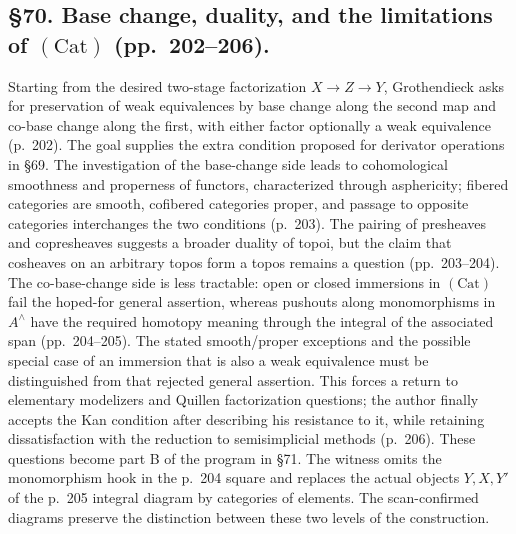 \documentclass[10pt,oneside]{book}
\begin{document}
\subsection*{\S70. Base change, duality, and the limitations of $(\mathrm{Cat})$ (pp.\ 202--206).}
Starting from the desired two-stage factorization $X\to Z\to Y$, Grothendieck asks for preservation of weak equivalences by base change along the second map and co-base change along the first, with either factor optionally a weak equivalence (p.\ 202). The goal supplies the extra condition proposed for derivator operations in \S69. The investigation of the base-change side leads to cohomological smoothness and properness of functors, characterized through asphericity; fibered categories are smooth, cofibered categories proper, and passage to opposite categories interchanges the two conditions (p.\ 203). The pairing of presheaves and copresheaves suggests a broader duality of topoi, but the claim that cosheaves on an arbitrary topos form a topos remains a question (pp.\ 203--204). The co-base-change side is less tractable: open or closed immersions in $(\mathrm{Cat})$ fail the hoped-for general assertion, whereas pushouts along monomorphisms in $A^{\wedge}$ have the required homotopy meaning through the integral of the associated span (pp.\ 204--205). The stated smooth/proper exceptions and the possible special case of an immersion that is also a weak equivalence must be distinguished from that rejected general assertion. This forces a return to elementary modelizers and Quillen factorization questions; the author finally accepts the Kan condition after describing his resistance to it, while retaining dissatisfaction with the reduction to semisimplicial methods (p.\ 206). These questions become part B of the program in \S71. The witness omits the monomorphism hook in the p.\ 204 square and replaces the actual objects $Y,X,Y'$ of the p.\ 205 integral diagram by categories of elements. The scan-confirmed diagrams preserve the distinction between these two levels of the construction.
\end{document}

